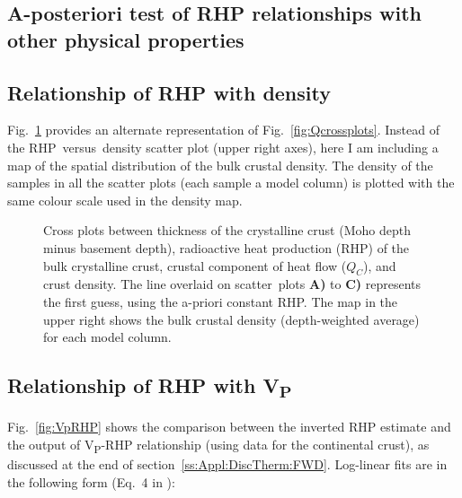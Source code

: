 \begin{subappendices}
\FloatBarrier

\section[
	tocentry={A-posteriori test of heat production relationships},
	head={A-posteriori test of RHP relationships with other physical properties}]{A-posteriori test of RHP relationships with other physical properties}
\label{s:ApplSup:Rel}

\subsection{Relationship of RHP with density}
\label{ss:ApplSup:Rel:Rho}

Fig.~\ref{fig:RhoRHP} provides an alternate representation of Fig.~\ref{fig:Qcrossplots}.
Instead of the RHP~versus~density scatter plot (upper right axes), here I am including a map of the spatial distribution of the bulk crustal density.
The density of the samples in all the scatter plots (each sample a model column) is plotted with the same colour scale used in the density map.

\begin{figure}
	\begin{adjustbox}{center}
	\end{adjustbox}
	\caption[Cross plots: crust thickness, RHP, crustal heat flow, crust density.]{Cross plots between thickness of the crystalline crust (Moho depth minus basement depth), radioactive heat production (RHP) of the bulk crystalline crust, crustal component of heat flow ($Q_C$), and crust density. The line overlaid on scatter~plots \textbf{A)} to \textbf{C)} represents the first guess, using the a-priori constant RHP.
	The map in the upper right shows the bulk crustal density (depth-weighted average) for each model column.}
	\label{fig:RhoRHP}
\end{figure}

\subsection[Relationship of RHP with VP]{Relationship of RHP with V\textsubscript{P}}
\label{ss:ApplSup:Rel:VP}

Fig.~\ref{fig:VpRHP} shows the comparison between the inverted RHP estimate and the output of \parencite{Hasterok2017_ign} V\textsubscript{P}-RHP relationship (using data for the continental crust), as discussed at the end of section~\ref{ss:Appl:DiscTherm:FWD}.
Log-linear fits are in the following form (Eq.~4 in \cite{Hasterok2017_ign}):


\end{subappendices}
